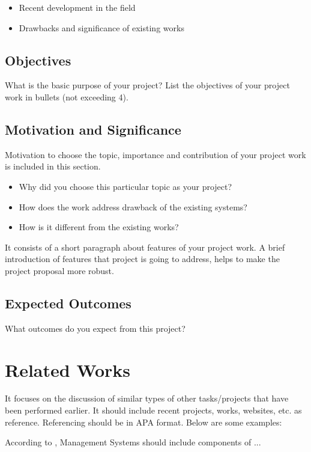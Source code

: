\documentclass{projectreport}
\begin{document}
	\begin{itemize}
		\item Recent development in the field
		\item Drawbacks and significance of existing works
	\end{itemize}
	
	\section{Objectives}
	What is the basic purpose of your project? List the objectives of your project work in bullets (not exceeding 4).
	
	\section{Motivation and Significance}
	Motivation to choose the topic, importance and contribution of your project work is included in this section.
	
	\begin{itemize}
		\item Why did you choose this particular topic as your project?
		\item How does the work address drawback of the existing systems?
		\item How is it different from the existing works?
	\end{itemize}

	It consists of a short paragraph about features of your project work. A brief introduction of features that project is going to address, helps to make the project proposal more robust.
	
	\section{Expected Outcomes}
	What outcomes do you expect from this project?
	
	\chapter{Related Works}
	
	It focuses on the discussion of similar types of other tasks/projects that have been performed earlier. It should include recent projects, works, websites, etc. as reference. Referencing should be in APA format. Below are some examples:
	
	According to \cite{doe2012}, Management Systems should include components of ...
	
\end{document}
